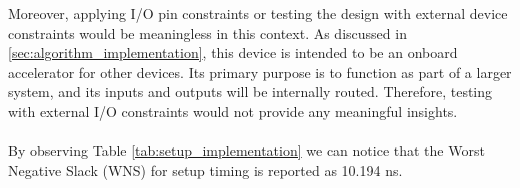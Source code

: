 Moreover, applying I/O pin constraints or testing the design with external device constraints would be meaningless in this context. As discussed in \ref{sec:algorithm_implementation}, this device is intended to be an onboard accelerator for other devices. Its primary purpose is to function as part of a larger system, and its inputs and outputs will be internally routed. Therefore, testing with external I/O constraints would not provide any meaningful insights.
\\\\
By observing Table \ref{tab:setup_implementation}  we can notice that the Worst Negative Slack (WNS) for setup timing is reported as 10.194 ns. 


